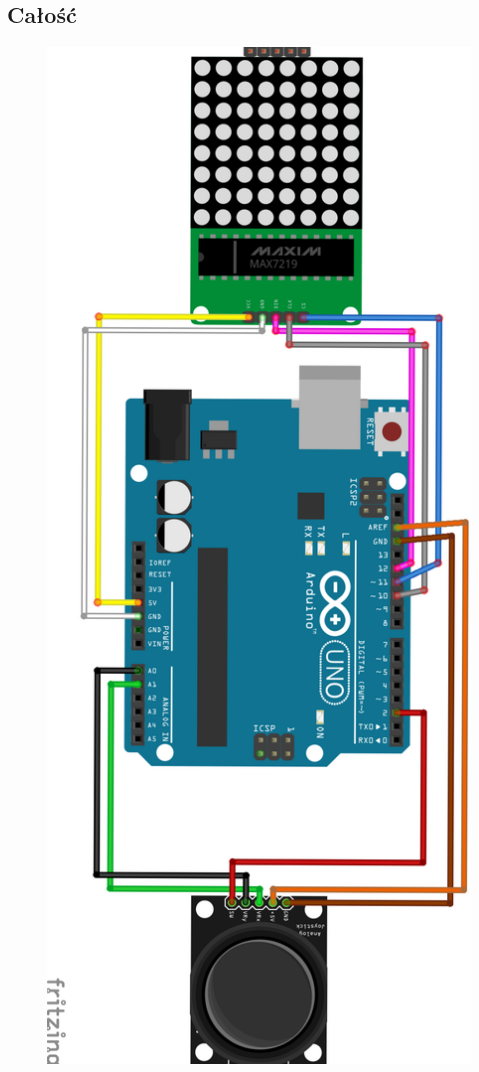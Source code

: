 \documentclass[12pt,notitlepage]{article}
\begin{document}
\subsection{Całość}
\begin{figure}[h!]
   \includegraphics[height=0.9\textheight]{schemat_bb.png}
   \centering
  \label{fig:schemat-calosc}
\end{figure}
\end{document}
